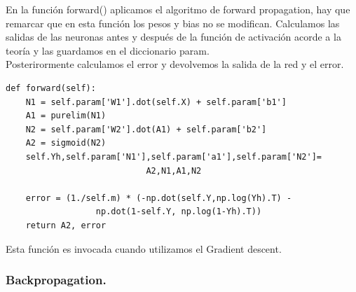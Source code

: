 \documentclass[a4paper,10pt]{article}
\begin{document}
En la función forward() aplicamos el algoritmo de forward propagation, hay que remarcar que en esta función los pesos y bias no se modifican. Calculamos las salidas de las neuronas antes y después de la función de activación acorde a la teoría y las guardamos en el diccionario param.\\ Posterirormente calculamos el error y devolvemos la salida de la red y el error.
\begin{lstlisting}
def forward(self):
    N1 = self.param['W1'].dot(self.X) + self.param['b1']
    A1 = purelim(N1)
    N2 = self.param['W2'].dot(A1) + self.param['b2']
    A2 = sigmoid(N2)
    self.Yh,self.param['N1'],self.param['a1'],self.param['N2']=
						    A2,N1,A1,N2

    error = (1./self.m) * (-np.dot(self.Y,np.log(Yh).T) - 
			      np.dot(1-self.Y, np.log(1-Yh).T))
    return A2, error
\end{lstlisting}
Esta función es invocada cuando utilizamos el Gradient descent.
\subsubsection{Backpropagation.}
\end{document}
